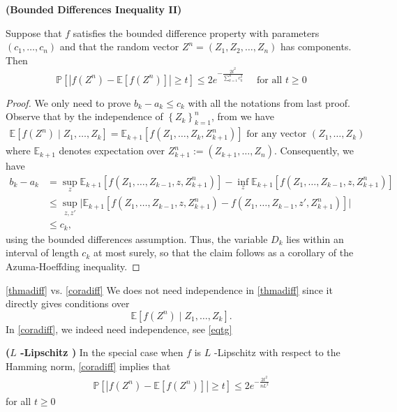 \documentclass{article}
\newcommand{\bfs}[1]{\textbf{({#1})}}
\begin{document}
\begin{cora}{\bfs{Bounded Differences Inequality II}}\label{coradiff}

Suppose that $f$ satisfies the bounded difference property with parameters $\left(c_{1}, \ldots, c_{n}\right)$ and that the random vector $Z^n=\left(Z_{1}, Z_{2}, \ldots, Z_{n}\right)$ has  components. Then
$$
\mathbb{P}[|f(Z^n)-\mathbb{E}[f(Z^n)]| \geq t] \leq 2 e^{-\frac{2t^{2}}{\sum_{k=1}^{n} c_{k}^{2}}} \quad \text { for all } t \geq 0
$$
\end{cora}
\begin{proof}
We only need to prove $b_k-a_k\le c_k$ with all the notations from last proof. Observe that by the independence of $\left\{Z_{k}\right\}_{k=1}^{n}$, from \cite[p. 209 Example 4.1.7.]{durrett2019probability} we have
\begin{align}
    \mathbb{E}\left[f(Z^n) \mid Z_{1}, \ldots, Z_{k}\right]=\mathbb{E}_{k+1}\left[f\left(Z_{1}, \ldots, Z_{k}, Z_{k+1}^{n}\right)\right]   \text{ for any vector }\left(Z_{1}, \ldots, Z_{k}\right)\label{eqtg}
\end{align}
where $\mathbb{E}_{k+1}$ denotes expectation over $Z_{k+1}^{n}:=\left(Z_{k+1}, \ldots, Z_{n}\right) .$ Consequently, we have
$$
\begin{aligned}
b_{k}-a_{k} &=\sup _{z} \mathbb{E}_{k+1}\left[f\left(Z_{1}, \ldots, Z_{k-1}, z, Z_{k+1}^{n}\right)\right]-\inf _{z} \mathbb{E}_{k+1}\left[f\left(Z_{1}, \ldots, Z_{k-1}, z, Z_{k+1}^{n}\right)\right]\\
& \leq \sup _{z, z'} \bigg| \mathbb{E}_{k+1}\left[f\left(Z_{1}, \ldots, Z_{k-1}, z, Z_{k+1}^{n}\right)-f\left(Z_{1}, \ldots, Z_{k-1}, z', Z_{k+1}^{n}\right)\right]\bigg| \\
& \leq c_{k},
\end{aligned}
$$
using the bounded differences assumption. Thus, the variable $D_{k}$ lies within an interval of length $c_{k}$ at most surely, so that the claim follows as a corollary of the Azuma-Hoeffding inequality.
\end{proof}

\begin{rema}{ \cref{thmadiff} vs. \cref{coradiff} }
We does not need independence in \cref{thmadiff} since it directly gives conditions over $$\mathbb{E}\left[f(Z^n) \mid Z_{1}, \ldots, Z_{k}\right].$$
In \cref{coradiff}, we indeed need independence, see \cref{eqtg}
\end{rema}
\begin{rema}{\bfs{$L$ -Lipschitz }}
In the special case when $f$ is $L$ -Lipschitz with respect to the Hamming norm, \cref{coradiff} implies that
\begin{align}
    \mathbb{P}[|f(Z^n)-\mathbb{E}[f(Z^n)]| \geq t] \leq 2 e^{-\frac{2 t^{2}}{n L^{2}}}\label{eqhamm}
\end{align}
for all $t \geq 0$
\end{rema} 
\end{document}
